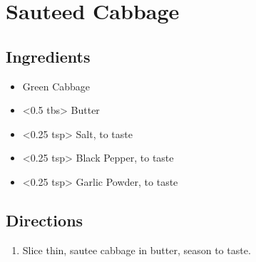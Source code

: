 \section{ Sauteed Cabbage }

\subsection{ Ingredients }

\begin{itemize}
  \item <3 oz> Green Cabbage
  \item <0.5 tbs> Butter
  \item <0.25 tsp> Salt, to taste
  \item <0.25 tsp> Black Pepper, to taste
  \item <0.25 tsp> Garlic Powder, to taste
\end{itemize}

\subsection{ Directions }

\begin{enumerate}
  \item Slice thin, sautee cabbage in butter, season to taste. 
\end{enumerate}

